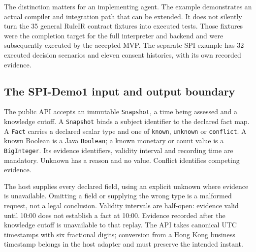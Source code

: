 \documentclass[12pt,a4paper,oneside,openany]{book}
\begin{document}
The distinction matters for an implementing agent. The example demonstrates an
actual compiler and integration path that can be extended. It does not silently
turn the 35 general RuleIR contract fixtures into executed tests. Those fixtures were the completion target for the full interpreter and
backend and were subsequently executed by the accepted MVP. The separate
SPI example has 32 executed decision scenarios and eleven consent histories, with
its own recorded evidence.

\subsection{The SPI-Demo1 input and output boundary}
\label{merge:P-03d-java-delivery:02}


The public API accepts an immutable \texttt{Snapshot}, a time being assessed and
a knowledge cutoff. A \texttt{Snapshot} binds a subject identifier to the
declared fact map. A \texttt{Fact} carries a declared scalar type and one of
\texttt{known}, \texttt{unknown} or \texttt{conflict}. A known Boolean is a Java
\texttt{Boolean}; a known monetary or count value is a \texttt{BigInteger}.
Its evidence identifiers, validity interval and recording time are mandatory.
Unknown has a reason and no value. Conflict identifies competing evidence.

The host supplies every declared field, using an explicit unknown where evidence
is unavailable. Omitting a field or supplying the wrong type is a malformed
request, not a legal conclusion. Validity intervals are half-open: evidence
valid until 10:00 does not establish a fact at 10:00. Evidence recorded after
the knowledge cutoff is unavailable to that replay. The API takes canonical UTC
timestamps with six fractional digits; conversion from a Hong Kong business
timestamp belongs in the host adapter and must preserve the intended instant.
\end{document}
